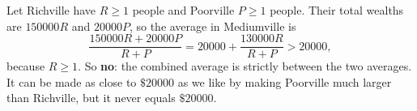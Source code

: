 Let Richville have $R\ge1$ people and Poorville $P\ge1$ people. Their total wealths are $150000R$ and $20000P$, so the average in Mediumville is
\[
\dfrac{150000R+20000P}{R+P}=20000+\dfrac{130000R}{R+P}>20000,
\]
because $R\ge1$. So \textbf{no}: the combined average is strictly between the two averages. It can be made as close to $\$20000$ as we like by making Poorville much larger than Richville, but it never equals $\$20000$.
